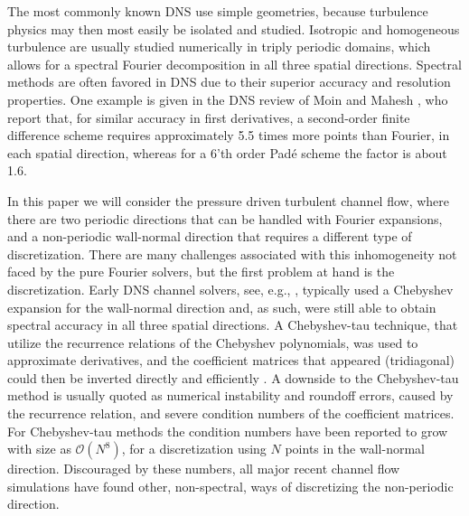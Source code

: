 \documentclass[preprint]{elsarticle}
\begin{document}
The most commonly known DNS use simple geometries, because turbulence physics may then most easily be isolated and studied. Isotropic and homogeneous turbulence are usually studied numerically in triply periodic domains, which allows for a spectral Fourier decomposition in all three spatial directions. Spectral methods are often favored in DNS due to their superior accuracy and resolution properties. One example is given in the DNS review of Moin and Mahesh \cite{Moin98}, who report that, for similar accuracy in first derivatives, a second-order finite difference scheme requires approximately 5.5 times more points than Fourier, in each spatial direction, whereas for a 6'th order Pad\'{e} scheme the factor is about 1.6.

In this paper we will consider the pressure driven turbulent channel flow, where there are two periodic directions that can be handled with Fourier expansions, and a non-periodic wall-normal direction that requires a different type of discretization. There are many challenges associated with this inhomogeneity not faced by the pure Fourier solvers, but the first problem at hand is the discretization. Early DNS channel solvers, see, e.g., \cite{Moin80, Kleiser80, Kim87}, typically used a Chebyshev expansion for the wall-normal direction and, as such, were still able to obtain spectral accuracy in all three spatial directions. A Chebyshev-tau technique, that utilize the recurrence relations of the Chebyshev polynomials, was used to approximate derivatives, and the coefficient matrices that appeared (tridiagonal) could then be inverted directly and efficiently \cite{Kim87}. A downside to the Chebyshev-tau method is usually quoted \cite{canuto1988} as numerical instability and roundoff errors, caused by the recurrence relation, and severe condition numbers of the coefficient matrices. For Chebyshev-tau methods the condition numbers have been reported to grow with size as $\mathcal{O}(N^8)$, for a discretization using $N$ points in the wall-normal direction. Discouraged by these numbers, all major recent channel flow simulations have found other, non-spectral, ways of discretizing the non-periodic direction. 
\end{document}
